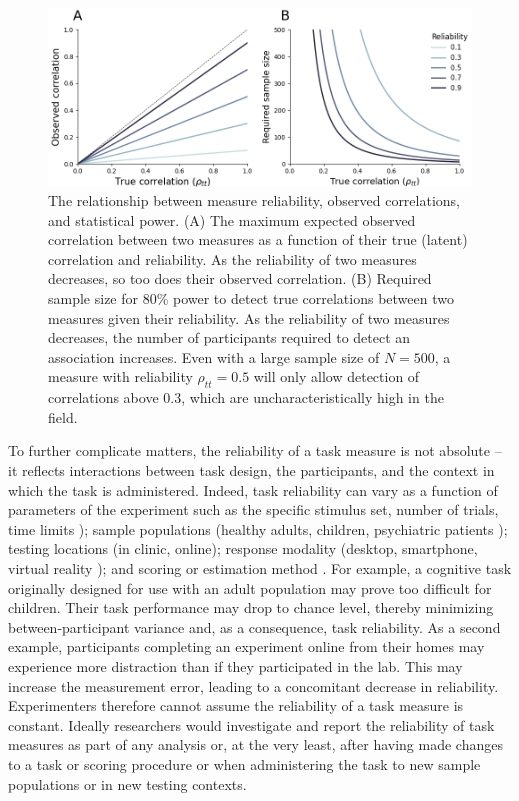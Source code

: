 \documentclass[a4paper,notitlepage,12pt]{article}
\begin{document}
\begin{figure}[tp]
    \centering
    \includegraphics[width=1.0\textwidth]{figures/fig01.png}
    \caption{\small The relationship between measure reliability, observed correlations, and statistical power. (A) The maximum expected observed correlation between two measures as a function of their true (latent) correlation and reliability. As the reliability of two measures decreases, so too does their observed correlation. (B) Required sample size for 80\% power to detect true correlations between two measures given their reliability. As the reliability of two measures decreases, the number of participants required to detect an association increases. Even with a large sample size of $N=500$, a measure with reliability $\rho_{tt} = 0.5$ will only allow detection of correlations above $0.3$, which are uncharacteristically high in the field.}
    \label{fig:fig01}
\end{figure}


To further complicate matters, the reliability of a task measure is not absolute -- it reflects interactions between task design, the participants, and the context in which the task is administered. Indeed, task reliability can vary as a function of parameters of the experiment such as the specific stimulus set, number of trials, time limits \cite{paap2016role, cooper2017role}); sample populations (healthy adults, children, psychiatric patients \cite{arnon2020current, cooper2017role}); testing locations (in clinic, online); response modality (desktop, smartphone, virtual reality \cite{pronk2022can, bruder2021reliability}); and scoring or estimation method \cite{Rouder2019-am, haines2020learning}. For example, a cognitive task originally designed for use with an adult population may prove too difficult for children. Their task performance may drop to chance level, thereby minimizing between-participant variance and, as a consequence, task reliability. As a second example, participants completing an experiment online from their homes may experience more distraction than if they participated in the lab. This may increase the measurement error, leading to a concomitant decrease in reliability. Experimenters therefore cannot assume the reliability of a task measure is constant. Ideally researchers would investigate and report the reliability of task measures as part of any analysis or, at the very least, after having made changes to a task or scoring procedure or when administering the task to new sample populations or in new testing contexts.
\end{document}
